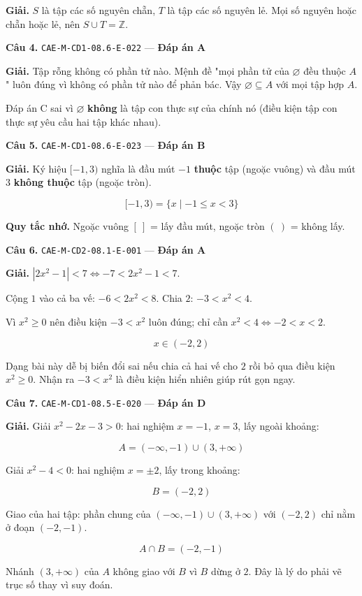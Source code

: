 \documentclass[11pt, a4paper]{article}
\begin{document}
\textbf{Giải.} $S$ là tập các số nguyên chẵn, $T$ là tập các số nguyên lẻ. Mọi số nguyên hoặc chẵn hoặc lẻ, nên $S \cup T = \mathbb{Z}$.

\textbf{Câu 4.} \texttt{CAE-M-CD1-08.6-E-022} — \textbf{Đáp án A}

\textbf{Giải.} Tập rỗng không có phần tử nào. Mệnh đề "mọi phần tử của $\varnothing$ đều thuộc $A$" luôn đúng vì không có phần tử nào để phản bác. Vậy $\varnothing \subseteq A$ với mọi tập hợp $A$.

 Đáp án C sai vì $\varnothing$ \textbf{không} là tập con thực sự của chính nó (điều kiện tập con thực sự yêu cầu hai tập khác nhau).

\textbf{Câu 5.} \texttt{CAE-M-CD1-08.6-E-023} — \textbf{Đáp án B}

\textbf{Giải.} Ký hiệu $[-1, 3)$ nghĩa là đầu mút $-1$ \textbf{thuộc} tập (ngoặc vuông) và đầu mút $3$ \textbf{không thuộc} tập (ngoặc tròn).

$$[-1, 3) = \{x \mid -1 \le x < 3\}$$

\textbf{Quy tắc nhớ.} Ngoặc vuông $[\ ]$ = lấy đầu mút, ngoặc tròn $(\ )$ = không lấy.

\textbf{Câu 6.} \texttt{CAE-M-CD2-08.1-E-001} — \textbf{Đáp án A}

\textbf{Giải.} $|2x^2 - 1| < 7 \iff -7 < 2x^2 - 1 < 7$.

Cộng $1$ vào cả ba vế: $-6 < 2x^2 < 8$. Chia $2$: $-3 < x^2 < 4$.

Vì $x^2 \ge 0$ nên điều kiện $-3 < x^2$ luôn đúng; chỉ cần $x^2 < 4 \iff -2 < x < 2$.

$$x \in (-2, 2)$$

 Dạng bài này dễ bị biến đổi sai nếu chia cả hai vế cho $2$ rồi bỏ qua điều kiện $x^2 \ge 0$. Nhận ra $-3 < x^2$ là điều kiện hiển nhiên giúp rút gọn ngay.

\textbf{Câu 7.} \texttt{CAE-M-CD1-08.5-E-020} — \textbf{Đáp án D}

\textbf{Giải.} Giải $x^2 - 2x - 3 > 0$: hai nghiệm $x = -1$, $x = 3$, lấy ngoài khoảng:

$$A = (-\infty, -1) \cup (3, +\infty)$$

Giải $x^2 - 4 < 0$: hai nghiệm $x = \pm 2$, lấy trong khoảng:

$$B = (-2, 2)$$

Giao của hai tập: phần chung của $(-\infty,-1) \cup (3,+\infty)$ với $(-2,2)$ chỉ nằm ở đoạn $(-2, -1)$.

$$A \cap B = (-2, -1)$$

 Nhánh $(3, +\infty)$ của $A$ không giao với $B$ vì $B$ dừng ở $2$. Đây là lý do phải vẽ trục số thay vì suy đoán.
\end{document}
